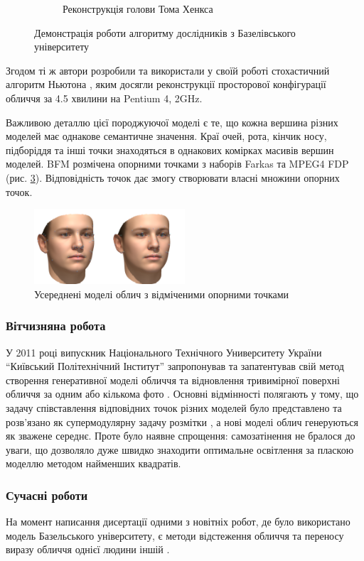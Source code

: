 \begin{figure}[h]
\begin{subfigure}[b]{0.3\textwidth}
    \caption{Реконструкція голови Тома Хенкса}
    \label{fig:bfm:tom-hanks}
  \end{subfigure}
  \caption{Демонстрація роботи алгоритму дослідників з Базелівського університету}
\end{figure}

Згодом ті ж автори розробили та використали у своїй роботі
стохастичний алгоритм Ньютона \cite{blanz:vetter:2003},
яким досягли реконструкції просторової конфігурації обличчя за 4.5 хвилини на
Pentium 4, 2GHz.

Важливою деталлю цієї породжуючої моделі є те,
що кожна вершина різних моделей має однакове семантичне значення.
Краї очей, рота, кінчик носу, підборіддя та інші точки
знаходяться в однакових комірках масивів вершин моделей.
BFM розмічена опорними точками з наборів Farkas та MPEG4 FDP
(рис. \ref{fig:problems:feature-points}).
Відповідність точок дає змогу створювати власні множини опорних точок.
\begin{figure}[h]
  \centering
    \includegraphics[width=0.5\textwidth]{images/feature-points}
  \caption{Усереднені моделі облич з відміченими опорними точками}
  \label{fig:problems:feature-points}
\end{figure}

\subsubsection{Вітчизняна робота}

У 2011 році випускник Національного Технічного Университету України
``Київський Політехнічний Інститут'' запропонував та запатентував
свій метод створення генеративної моделі обличчя та відновлення
тривимірної поверхні обличчя за одним або кількома фото \cite{tyshchenko:2011}.
Основні відмінності полягають у тому,
що задачу співставлення відповідних точок різних моделей
було представлено та розв'язано як супермодулярну задачу розмітки
\cite{Rossi:2006:HCP:1207782},
а нові моделі облич генеруються як зважене середнє.
Проте було наявне спрощення: самозатінення не бралося до уваги,
що дозволяло дуже швидко знаходити оптимальне освітлення
за пласкою моделлю методом найменших квадратів.

\subsubsection{Сучасні роботи}

На момент написання дисертації одними з новітніх робот,
де було використано модель Базельського університету,
є методи відстеження обличчя \cite{Saito2016}
та переносу виразу обличчя однієї людини іншій \cite{thies2016face}.
